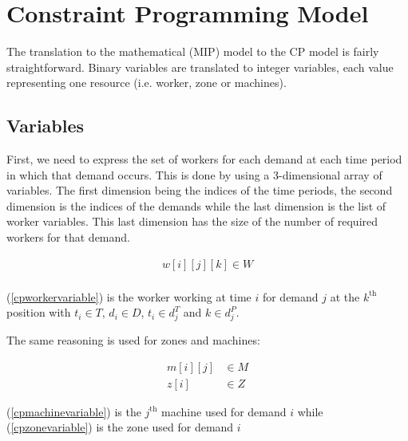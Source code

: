 \documentclass[../thesis.tex]{subfiles}
\begin{document}
\section{Constraint Programming Model}

The translation to the mathematical (MIP) model to the CP model is fairly
straightforward. Binary variables are translated to integer variables, each value representing
one resource (i.e. worker, zone or machines).



\subsection{Variables}

First, we need to express the set of workers for each demand at each time period in which that demand occurs.
This is done by using a 3-dimensional array of variables. The first dimension being the indices of the 
time periods, the second dimension is the indices of the demands while the last dimension is the list of worker variables. 
This last dimension has the size of the number of required workers for that demand.

\begin{equation}
\begin{split}
    w[i][j][k] \in W \label{cpworkervariable} \\
\end{split}
\end{equation}

(\ref{cpworkervariable}) is the worker working at time $i$ for demand $j$ at the $k^{\text{th}}$ position 
with $t_i \in T$, $d_i \in D$, $t_i \in d_j^T$ and $k \in d^P_j$.

The same reasoning is used for zones and machines:

\begin{align}
    m[i][j] &\in M \label{cpmachinevariable} \\ 
    z[i] &\in Z \label{cpzonevariable} 
\end{align}

(\ref{cpmachinevariable}) is the $j^{\text{th}}$ machine used for demand $i$ while (\ref{cpzonevariable}) is the zone used for demand $i$
\end{document}
